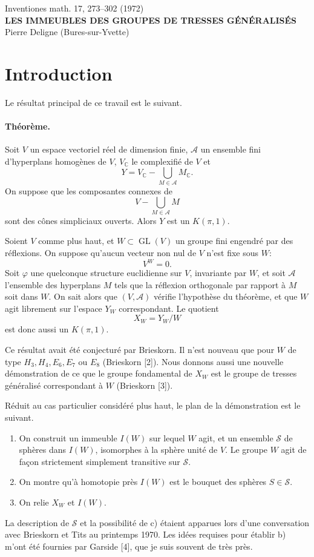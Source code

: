 \documentclass[10pt]{article}
\newcommand{\C}{\mathbb C}
\newcommand{\GL}{\operatorname{GL}}
\newcommand{\mcA}{\mathcal A}
\newcommand{\mcS}{\mathcal S}
\begin{document}
\begin{center}
{\large Inventiones math. 17, 273--302 (1972)}\\[0.4em]
{\Large\bfseries LES IMMEUBLES DES GROUPES DE TRESSES GÉNÉRALISÉS}\\[0.4em]
Pierre Deligne (Bures-sur-Yvette)
\end{center}

\section*{Introduction}

Le résultat principal de ce travail est le suivant.

\paragraph{Théorème.} Soit $V$ un espace vectoriel réel de dimension finie, $\mcA$ un ensemble fini d'hyperplans homogènes de $V$, $V_\C$ le complexifié de $V$ et
\[
Y=V_\C-\bigcup_{M\in\mcA}M_\C.
\]
On suppose que les composantes connexes de
\[
V-\bigcup_{M\in\mcA}M
\]
sont des cônes simpliciaux ouverts. Alors $Y$ est un $K(\pi,1)$.

Soient $V$ comme plus haut, et $W\subset \GL(V)$ un groupe fini engendré par des réflexions. On suppose qu'aucun vecteur non nul de $V$ n'est fixe sous $W$:
\[
V^W=0.
\]
Soit $\varphi$ une quelconque structure euclidienne sur $V$, invariante par $W$, et soit $\mcA$ l'ensemble des hyperplans $M$ tels que la réflexion orthogonale par rapport à $M$ soit dans $W$. On sait alors que $(V,\mcA)$ vérifie l'hypothèse du théorème, et que $W$ agit librement sur l'espace $Y_W$ correspondant. Le quotient
\[
X_W=Y_W/W
\]
est donc aussi un $K(\pi,1)$.

Ce résultat avait été conjecturé par Brieskorn. Il n'est nouveau que pour $W$ de type $H_3,H_4,E_6,E_7$ ou $E_8$ (Brieskorn [2]). Nous donnons aussi une nouvelle démonstration de ce que le groupe fondamental de $X_W$ est le groupe de tresses généralisé correspondant à $W$ (Brieskorn [3]).

Réduit au cas particulier considéré plus haut, le plan de la démonstration est le suivant.
\begin{enumerate}[label=\alph*)]
\item On construit un immeuble $I(W)$ sur lequel $W$ agit, et un ensemble $\mcS$ de sphères dans $I(W)$, isomorphes à la sphère unité de $V$. Le groupe $W$ agit de façon strictement simplement transitive sur $\mcS$.
\item On montre qu'à homotopie près $I(W)$ est le bouquet des sphères $S\in\mcS$.
\item On relie $X_W$ et $I(W)$.
\end{enumerate}
La description de $\mcS$ et la possibilité de c) étaient apparues lors d'une conversation avec Brieskorn et Tits au printemps 1970. Les idées requises pour établir b) m'ont été fournies par Garside [4], que je suis souvent de très près.
\end{document}
